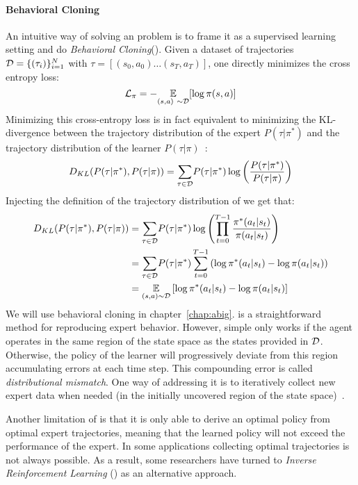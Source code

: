 \paragraph{Behavioral Cloning}

An intuitive way of solving an \il problem is to frame it as a supervised learning setting and do \textit{Behavioral Cloning}(\bc). Given a dataset of trajectories $\mathcal{D}=\{(\tau_i)\}_{i=1}^N$ with  $\tau=[(s_0,a_0) \dots (s_T,a_T)]$, one directly minimizes the cross entropy loss:
\begin{equation}
\mathcal{L}_\pi = -\underset{(s,a)~\sim\mathcal{D}}{\mathbb{E}}[\log\pi(s,a)]
\end{equation}
Minimizing this cross-entropy loss is in fact equivalent to minimizing the KL-divergence between the trajectory distribution of the expert $P(\tau|\pi^*)$ and the trajectory distribution of the learner $P(\tau|\pi)$~\citep{ke2020imitation}:
\begin{equation}
D_{KL}(P(\tau|\pi^*),P(\tau|\pi)) = \underset{\tau \in \mathcal{D}}{\sum}P(\tau|\pi^*)\log\left(\frac{P(\tau|\pi^*)}{P(\tau|\pi)}\right)
\end{equation}
%
Injecting the definition of the trajectory distribution of  we get that:
%
\begin{align}
D_{KL}(P(\tau|\pi^*),P(\tau|\pi)) &= \underset{\tau \in \mathcal{D}}{\sum}P(\tau|\pi^*)\log\left(\prod_{t=0}^{T-1}\frac{\pi^*(a_t|s_t)}{\pi(a_t|s_t)}\right) \\
&= \underset{\tau \in \mathcal{D}}{\sum}P(\tau|\pi^*)\sum_{t=0}^{T-1}\left(\log\pi^*(a_t|s_t) - \log\pi(a_t|s_t)\right) \\
&= \underset{(s,a)\sim\mathcal{D}}{\mathbb{E}}\left[\log\pi^*(a_t|s_t) - \log\pi(a_t|s_t)\right]
\end{align}
%
We will use behavioral cloning in chapter~\ref{chap:abig}. \bc is a straightforward method for reproducing expert behavior. However, simple \bc only works if the agent operates in the same region of the state space as the states provided in $\mathcal{D}$. Otherwise, the policy of the learner will progressively deviate from this region accumulating errors at each time step. This compounding error is called \textit{distributional mismatch}. One way of addressing it is to iteratively collect new expert data when needed (in the initially uncovered region of the state space)~\citep{dagger2011}. 

Another limitation of \bc is that it is only able to derive an optimal policy from optimal expert trajectories, meaning that the learned policy will not exceed the performance of the expert. In some applications collecting optimal trajectories is not always possible. As a result, some researchers have turned to \textit{Inverse Reinforcement Learning} (\irl) as an alternative approach.

